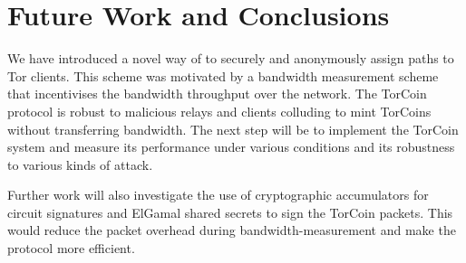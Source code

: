 \section{Future Work and Conclusions} \label{conc}

We have introduced a novel way of to securely and anonymously assign paths to
Tor clients. This scheme was motivated by a bandwidth measurement scheme that
incentivises the bandwidth throughput over the network. The TorCoin protocol
is robust to malicious relays and clients colluding to mint TorCoins without
transferring bandwidth. The next step will be to implement the TorCoin system
and measure its performance under various conditions and its robustness to
various kinds of attack.

Further work will also investigate the use of cryptographic accumulators for
circuit signatures and ElGamal shared secrets to sign the TorCoin packets.
This would reduce the packet overhead during bandwidth-measurement and make
the protocol more efficient.
